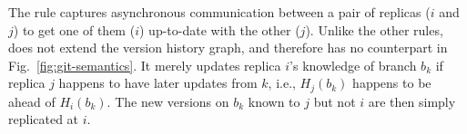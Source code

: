 The rule  captures asynchronous communication between
a pair of replicas ($i$ and $j$) to get one of them ($i$) up-to-date
with the other ($j$).  Unlike the other rules,  does
not extend the version history graph, and therefore has no counterpart
in Fig.~\ref{fig:git-semantics}. It merely updates replica $i$'s
knowledge of branch $b_k$ if replica $j$ happens to have later updates
from $k$, i.e., $H_j(b_k)$ happens to be ahead of $H_i(b_k)$. The new
versions on $b_k$ known to $j$ but not $i$ are then simply replicated
at $i$.


